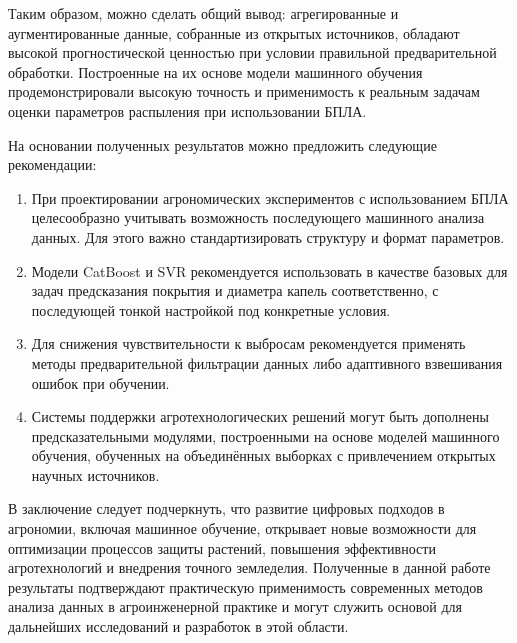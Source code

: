 Таким образом, можно сделать общий вывод: агрегированные и аугментированные данные, собранные из открытых источников, обладают высокой прогностической ценностью при условии правильной предварительной обработки. Построенные на их основе модели машинного обучения продемонстрировали высокую точность и применимость к реальным задачам оценки параметров распыления при использовании БПЛА.

На основании полученных результатов можно предложить следующие рекомендации:

\begin{enumerate}
\item При проектировании агрономических экспериментов с использованием БПЛА целесообразно учитывать возможность последующего машинного анализа данных. Для этого важно стандартизировать структуру и формат параметров.
\item Модели CatBoost и SVR рекомендуется использовать в качестве базовых для задач предсказания покрытия и диаметра капель соответственно, с последующей тонкой настройкой под конкретные условия.
\item Для снижения чувствительности к выбросам рекомендуется применять методы предварительной фильтрации данных либо адаптивного взвешивания ошибок при обучении.
\item Системы поддержки агротехнологических решений могут быть дополнены предсказательными модулями, построенными на основе моделей машинного обучения, обученных на объединённых выборках с привлечением открытых научных источников.
\end{enumerate}

В заключение следует подчеркнуть, что развитие цифровых подходов в агрономии, включая машинное обучение, открывает новые возможности для оптимизации процессов защиты растений, повышения эффективности агротехнологий и внедрения точного земледелия. Полученные в данной работе результаты подтверждают практическую применимость современных методов анализа данных в агроинженерной практике и могут служить основой для дальнейших исследований и разработок в этой области.

